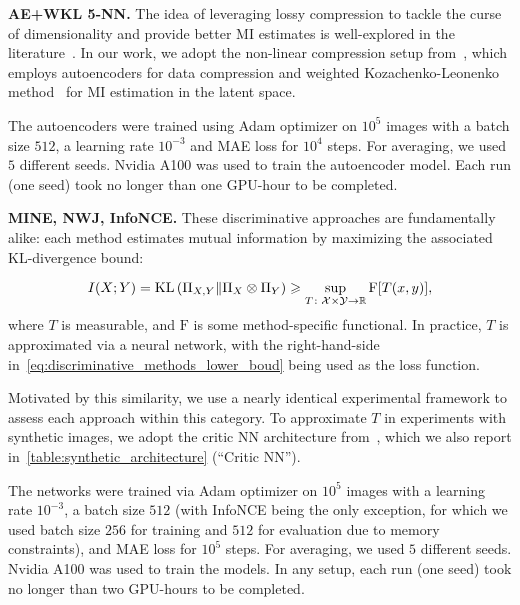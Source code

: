 \textbf{AE+WKL 5-NN.} The idea of leveraging lossy compression to tackle the curse of dimensionality and provide better MI estimates is well-explored in the literature~\cite{goldfeld2021sliced_MI, goldfeld2022k_sliced_MI, tsur2023max_sliced_MI, fayad2023optimal_sliced_MI, kristjan2023smoothed_entropy_PCA, butakov2024lossy_compression}.
In our work, we adopt the non-linear compression setup from~\cite{butakov2024lossy_compression}, which employs autoencoders for data compression and weighted Kozachenko-Leonenko method~\cite{berrett2019efficient_knn_entropy_estimation} for MI estimation in the latent space.

The autoencoders were trained using Adam optimizer
on $ 10^5 $ images with a batch size $ 512 $, a learning rate $ 10^{-3} $ and MAE loss for $ 10^4 $ steps.
For averaging, we used $ 5 $ different seeds.
Nvidia A100 was used to train the autoencoder model.
Each run (one seed) took no longer than one GPU-hour to be completed.

\textbf{MINE, NWJ, InfoNCE.} 
These discriminative approaches are fundamentally alike: each method estimates mutual information by maximizing the associated KL-divergence bound:

\begin{equation}
    \label{eq:discriminative_methods_lower_boud}
    I(X;Y) = \mathrm{KL}\left(\Pi_{X,Y} \middle\Vert \Pi_X \otimes \Pi_Y\right) \geqslant \sup_{T \colon \mathcal{X} \times \mathcal{Y} \to \mathbb{R}} \mathrm{F}[T(x,y)],
\end{equation}
where $ T $ is measurable, and $ \mathrm{F} $ is some method-specific functional.
In practice, $ T $ is approximated via a neural network, with the right-hand-side in~\eqref{eq:discriminative_methods_lower_boud} being used as the loss function.

Motivated by this similarity, we use a nearly identical experimental framework to assess each approach within this category.
To approximate $ T $ in experiments with synthetic images, we adopt the critic NN architecture from~\cite{butakov2024normflows}, which we also report in~\cref{table:synthetic_architecture} (``Critic NN'').

The networks were trained via Adam optimizer
on $ 10^5 $ images with a learning rate $ 10^{-3} $, a batch size $ 512 $ (with InfoNCE being the only exception, for which we used batch size $ 256 $ for training and $ 512 $ for evaluation due to memory constraints), and MAE loss for $ 10^5 $ steps.
For averaging, we used $ 5 $ different seeds.
Nvidia A100 was used to train the models.
In any setup, each run (one seed) took no longer than two GPU-hours to be completed.

